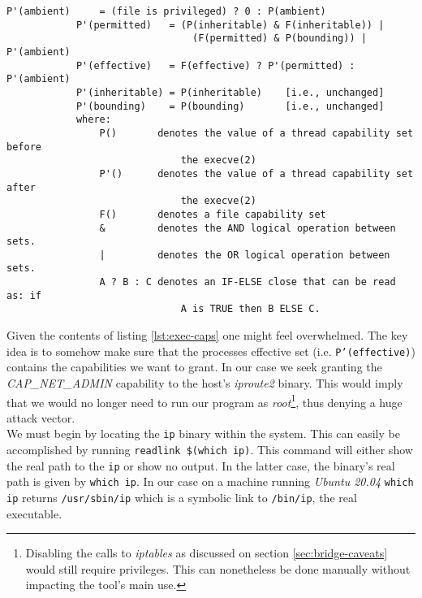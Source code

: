         \begin{lstlisting}[language = {}, caption = Transformation of Capabilities During \texttt{execve()}., label = lst:exec-caps]
            P'(ambient)     = (file is privileged) ? 0 : P(ambient)
            P'(permitted)   = (P(inheritable) & F(inheritable)) |
                                (F(permitted) & P(bounding)) | P'(ambient)
            P'(effective)   = F(effective) ? P'(permitted) : P'(ambient)
            P'(inheritable) = P(inheritable)    [i.e., unchanged]
            P'(bounding)    = P(bounding)       [i.e., unchanged]
            where:
                P()       denotes the value of a thread capability set before
                              the execve(2)
                P'()      denotes the value of a thread capability set after
                              the execve(2)
                F()       denotes a file capability set
                &         denotes the AND logical operation between sets.
                |         denotes the OR logical operation between sets.
                A ? B : C denotes an IF-ELSE close that can be read as: if
                              A is TRUE then B ELSE C.
        \end{lstlisting}

        Given the contents of listing \ref{lst:exec-caps} one might feel overwhelmed. The key idea is to somehow make sure that the processes effective set (i.e. \texttt{P'(effective)}) contains the capabilities we want to grant. In our case we seek granting the \textit{CAP\_NET\_ADMIN} capability to the host's \textit{iproute2} binary. This would imply that we would no longer need to run our program as \textit{root}\footnote{Disabling the calls to \textit{iptables} as discussed on section \ref{sec:bridge-caveats} would still require privileges. This can nonetheless be done manually without impacting the tool's main use.}, thus denying a huge attack vector.\\

        We must begin by locating the \texttt{ip} binary within the system. This can easily be accomplished by running \texttt{\allowbreak readlink \$(which ip)}. This command will either show the real path to the \texttt{ip} or show no output. In the latter case, the binary's real path is given by \texttt{which ip}. In our case on a machine running \textit{Ubuntu 20.04} \texttt{which ip} returns \texttt{/usr/sbin/ip} which is a symbolic link to \texttt{/bin/ip}, the real executable.\\

